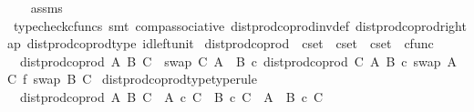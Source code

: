 \begin{isabellebody}
%
\isadelimproof
\ \ %
\endisadelimproof
%
\isatagproof
{}\isamarkupfalse%
\ assms\ \isamarkupfalse%
\ {\isacharparenleft}{\kern0pt}typecheck{\isacharunderscore}{\kern0pt}cfuncs{\isacharcomma}{\kern0pt}\ smt\ comp{\isacharunderscore}{\kern0pt}associative{}\ dist{\isacharunderscore}{\kern0pt}prod{\isacharunderscore}{\kern0pt}coprod{\isacharunderscore}{\kern0pt}inv{\isacharunderscore}{\kern0pt}def{}\ dist{\isacharunderscore}{\kern0pt}prod{\isacharunderscore}{\kern0pt}coprod{\isacharunderscore}{\kern0pt}right{\isacharunderscore}{\kern0pt}ap\ dist{\isacharunderscore}{\kern0pt}prod{\isacharunderscore}{\kern0pt}coprod{\isacharunderscore}{\kern0pt}type\ id{\isacharunderscore}{\kern0pt}left{\isacharunderscore}{\kern0pt}unit{}{\isacharparenright}{\kern0pt}%
\endisatagproof
{\isafoldproof}%
%
\isadelimproof
%
\endisadelimproof
%
\isadelimdocument
%
\endisadelimdocument
%
\isatagdocument
%
\isamarkuptrue%
%
\endisatagdocument
{\isafolddocument}%
%
\isadelimdocument
%
\endisadelimdocument
{}\isamarkupfalse%
\ dist{\isacharunderscore}{\kern0pt}prod{\isacharunderscore}{\kern0pt}coprod{}\ {\isacharcolon}{\kern0pt}{\isacharcolon}{\kern0pt}\ {\isachardoublequoteopen}cset\ {\isasymRightarrow}\ cset\ {\isasymRightarrow}\ cset\ {\isasymRightarrow}\ cfunc{\isachardoublequoteclose}\ \isanewline
\ \ {\isachardoublequoteopen}dist{\isacharunderscore}{\kern0pt}prod{\isacharunderscore}{\kern0pt}coprod{}\ A\ B\ C\ {\isacharequal}{\kern0pt}\ swap\ C\ {\isacharparenleft}{\kern0pt}A\ {\isasymCoprod}\ B{\isacharparenright}{\kern0pt}\ {\isasymcirc}\isactrlsub c\ dist{\isacharunderscore}{\kern0pt}prod{\isacharunderscore}{\kern0pt}coprod\ C\ A\ B\ {\isasymcirc}\isactrlsub c\ {\isacharparenleft}{\kern0pt}swap\ A\ C\ {\isasymbowtie}\isactrlsub f\ swap\ B\ C{\isacharparenright}{\kern0pt}{\isachardoublequoteclose}\isanewline
\isanewline
{}\isamarkupfalse%
\ dist{\isacharunderscore}{\kern0pt}prod{\isacharunderscore}{\kern0pt}coprod{}{\isacharunderscore}{\kern0pt}type{\isacharbrackleft}{\kern0pt}type{\isacharunderscore}{\kern0pt}rule{\isacharbrackright}{\kern0pt}{\isacharcolon}{\kern0pt}\isanewline
\ \ {\isachardoublequoteopen}dist{\isacharunderscore}{\kern0pt}prod{\isacharunderscore}{\kern0pt}coprod{}\ A\ B\ C\ {\isacharcolon}{\kern0pt}\ {\isacharparenleft}{\kern0pt}A\ {\isasymtimes}\isactrlsub c\ C{\isacharparenright}{\kern0pt}\ {\isasymCoprod}\ {\isacharparenleft}{\kern0pt}B\ {\isasymtimes}\isactrlsub c\ C{\isacharparenright}{\kern0pt}\ {\isasymrightarrow}\ {\isacharparenleft}{\kern0pt}A\ {\isasymCoprod}\ B{\isacharparenright}{\kern0pt}\ {\isasymtimes}\isactrlsub c\ C{\isachardoublequoteclose}\isanewline

\end{isabellebody}
